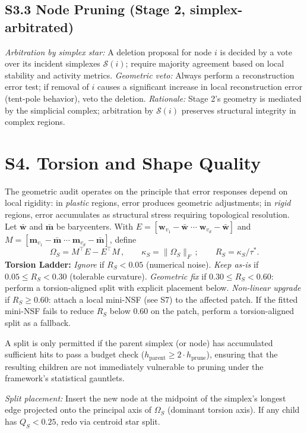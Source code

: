 \documentclass[11pt]{article}
\begin{document}
\subsection*{S3.3 Node Pruning (Stage 2, simplex-arbitrated)}
\emph{Arbitration by simplex star:} A deletion proposal for node $i$ is decided by a vote over its incident simplexes $\mathcal S(i)$; require majority agreement based on local stability and activity metrics. \emph{Geometric veto:} Always perform a reconstruction error test; if removal of $i$ causes a significant increase in local reconstruction error (tent-pole behavior), veto the deletion. \emph{Rationale:} Stage 2's geometry is mediated by the simplicial complex; arbitration by $\mathcal S(i)$ preserves structural integrity in complex regions.

\section*{S4. Torsion and Shape Quality}
The geometric audit operates on the principle that error responses depend on local rigidity: in \emph{plastic} regions, error produces geometric adjustments; in \emph{rigid} regions, error accumulates as structural stress requiring topological resolution. Let $\bar{\mathbf w}$ and $\bar{\mathbf m}$ be barycenters. With $E=[\mathbf w_{v_1}{-}\bar{\mathbf w}\;\cdots\;\mathbf w_{v_d}{-}\bar{\mathbf w}]$ and $M=[\mathbf m_{v_1}{-}\bar{\mathbf m}\;\cdots\;\mathbf m_{v_d}{-}\bar{\mathbf m}]$, define
\[\Omega_S = M^{\top}E - E^{\top}M\,,\qquad \kappa_S = \lVert \Omega_S \rVert_F\,;\qquad R_S = \kappa_S/\tau^*.\]
\textbf{Torsion Ladder:} \emph{Ignore} if $R_S{<}0.05$ (numerical noise). \emph{Keep as-is} if $0.05\le R_S{<}0.30$ (tolerable curvature). \emph{Geometric fix} if $0.30\le R_S{<}0.60$: perform a torsion-aligned split with explicit placement below. \emph{Non-linear upgrade} if $R_S\ge 0.60$: attach a local mini-NSF (see S7) to the affected patch. If the fitted mini-NSF fails to reduce $R_S$ below $0.60$ on the patch, perform a torsion-aligned split as a fallback.

A split is only permitted if the parent simplex (or node) has accumulated sufficient hits to pass a budget check ($h_{\mathrm{parent}} \ge 2 \cdot h_{\mathrm{prune}}$), ensuring that the resulting children are not immediately vulnerable to pruning under the framework's statistical gauntlets.

\emph{Split placement:} Insert the new node at the midpoint of the simplex's longest edge projected onto the principal axis of $\Omega_S$ (dominant torsion axis). If any child has $Q_S{<}0.25$, redo via centroid star split.
\end{document}
